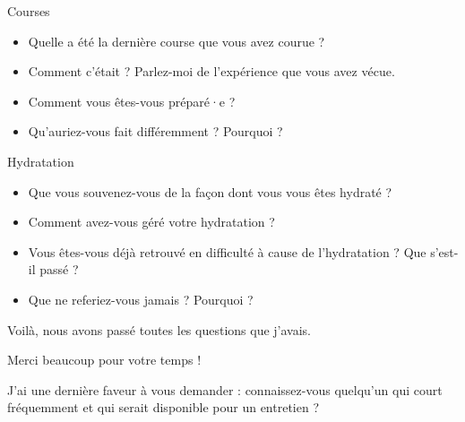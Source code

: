 Courses

\begin{itemize}
\item Quelle a été la dernière course que vous avez courue ?
\item Comment c'était ? Parlez-moi de l'expérience que vous avez vécue.
\item Comment vous êtes-vous préparé·e ?
\item Qu'auriez-vous fait différemment ? Pourquoi ?
\end{itemize}

Hydratation

\begin{itemize}
\item Que vous souvenez-vous de la façon dont vous vous êtes hydraté ?
\item Comment avez-vous géré votre hydratation ?
\item Vous êtes-vous déjà retrouvé en difficulté à cause de l'hydratation ? Que s'est-il passé ?
\item Que ne referiez-vous jamais ? Pourquoi ?
\end{itemize}

Voilà, nous avons passé toutes les questions que j'avais.

Merci beaucoup pour votre temps !

J'ai une dernière faveur à vous demander : connaissez-vous quelqu'un qui court fréquemment et qui serait disponible pour un entretien ?

